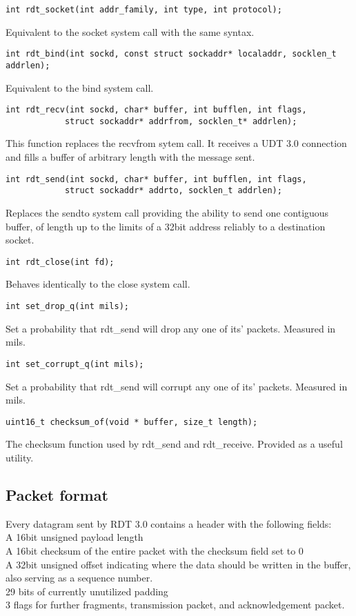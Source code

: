 \documentclass[11pt]{article}
\begin{document}
\begin{Verbatim}
int rdt_socket(int addr_family, int type, int protocol);
\end{Verbatim}
Equivalent to the socket system call with the same syntax.
\begin{Verbatim}
int rdt_bind(int sockd, const struct sockaddr* localaddr, socklen_t addrlen);
\end{Verbatim}
Equivalent to the bind system call.
\begin{Verbatim}[obeytabs]
int rdt_recv(int sockd, char* buffer, int bufflen, int flags, 
			struct sockaddr* addrfrom, socklen_t* addrlen);
\end{Verbatim}
This function replaces the recvfrom sytem call.  It receives a UDT 3.0 connection and fills a buffer of arbitrary length with the message sent. 
\begin{Verbatim}[obeytabs]			
int rdt_send(int sockd, char* buffer, int bufflen, int flags, 
			struct sockaddr* addrto, socklen_t addrlen);
\end{Verbatim}
Replaces the sendto system call providing the ability to send one contiguous buffer, of length up to the limits of a 32bit address reliably to a destination socket.
\begin{Verbatim}
int rdt_close(int fd);
\end{Verbatim}
Behaves identically to the close system call.
\begin{Verbatim}
int set_drop_q(int mils);
\end{Verbatim}
Set a probability that rdt\_send will drop any one of its' packets.  Measured in mils.
\begin{Verbatim}
int set_corrupt_q(int mils);
\end{Verbatim}
Set a probability that rdt\_send will corrupt any one of its' packets.  Measured in mils.
\begin{Verbatim}
uint16_t checksum_of(void * buffer, size_t length);
\end{Verbatim}
The checksum function used by rdt\_send and rdt\_receive.  Provided as a useful utility.
\subsection{Packet format}
Every datagram sent by RDT 3.0 contains a header with the following fields:\\
A 16bit unsigned payload length\\
A 16bit checksum of the entire packet with the checksum field set to 0\\
A 32bit unsigned offset indicating where the data should be written in the buffer, also serving as a sequence number.\\
29 bits of currently unutilized padding\\
3 flags for further fragments, transmission packet, and acknowledgement packet.\\
\end{document}
